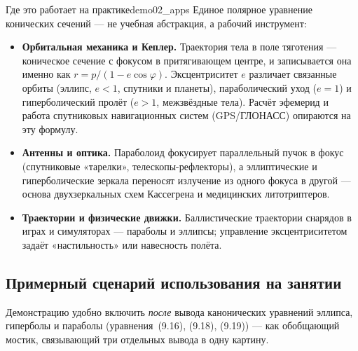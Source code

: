 \begin{remarkIT}{Где это работает на практике}{demo02_apps}
  Единое полярное уравнение конических сечений — не учебная абстракция, а
  рабочий инструмент:
  \begin{itemize}
    \item \textbf{Орбитальная механика и Кеплер.} Траектория тела в поле
      тяготения — коническое сечение с фокусом в притягивающем центре, и
      записывается она именно как $r = p/(1 - e\cos\varphi)$. Эксцентриситет
      $e$ различает связанные орбиты (эллипс, $e < 1$, спутники и планеты),
      параболический уход ($e = 1$) и гиперболический пролёт ($e > 1$,
      межзвёздные тела). Расчёт эфемерид и работа спутниковых
      навигационных систем (GPS/ГЛОНАСС) опираются на эту формулу.
    \item \textbf{Антенны и оптика.} Параболоид фокусирует параллельный
      пучок в фокус (спутниковые «тарелки», телескопы-рефлекторы), а
      эллиптические и гиперболические зеркала переносят излучение из одного
      фокуса в другой — основа двухзеркальных схем Кассегрена и медицинских
      литотриптеров.
    \item \textbf{Траектории и физические движки.} Баллистические
      траектории снарядов в играх и симуляторах — параболы и эллипсы;
      управление эксцентриситетом задаёт «настильность» или навесность
      полёта.
  \end{itemize}
\end{remarkIT}

\subsection*{Примерный сценарий использования на занятии}

Демонстрацию удобно включить \emph{после} вывода канонических уравнений
эллипса, гиперболы и параболы (уравнения~(9.16), (9.18), (9.19)) — как
обобщающий мостик, связывающий три отдельных вывода в одну картину.

